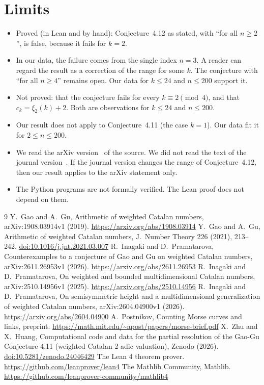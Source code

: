 \documentclass[11pt]{article}
\theoremstyle{remark}
\begin{document}
\section{Limits}

\begin{itemize}
\item Proved (in Lean and by hand): Conjecture~4.12 as stated, with ``for all $n\ge2$'', is false, because it fails for $k=2$.
\item In our data, the failure comes from the single index $n=3$. A reader can regard the result as a correction of the range for some $k$. The conjecture with ``for all $n\ge4$'' remains open. Our data for $k\le 24$ and $n\le 200$ support it.
\item Not proved: that the conjecture fails for every $k\equiv2\pmod 4$, and that $c_k=\xi_2(k)+2$. Both are observations for $k\le 24$ and $n\le 200$.
\item Our result does not apply to Conjecture~4.11 (the case $k=1$). Our data fit it for $2\le n\le 200$.
\item We read the arXiv version~\cite{GG} of the source. We did not read the text of the journal version~\cite{GGjnt}. If the journal version changes the range of Conjecture~4.12, then our result applies to the arXiv statement only.
\item The Python programs are not formally verified. The Lean proof does not depend on them.
\end{itemize}

\begin{thebibliography}{9}
 Y.~Gao and A.~Gu, Arithmetic of weighted Catalan numbers, arXiv:1908.03914v1 (2019). \url{https://arxiv.org/abs/1908.03914}
 Y.~Gao and A.~Gu, Arithmetic of weighted Catalan numbers, J.~Number Theory 226 (2021), 213--242. \href{https://doi.org/10.1016/j.jnt.2021.03.007}{doi:10.1016/j.jnt.2021.03.007}
 R.~Inagaki and D.~Pramatarova, Counterexamples to a conjecture of Gao and Gu on weighted Catalan numbers, arXiv:2611.26953v1 (2026). \url{https://arxiv.org/abs/2611.26953}
 R.~Inagaki and D.~Pramatarova, On weighted and bounded multidimensional Catalan numbers, arXiv:2510.14956v1 (2025). \url{https://arxiv.org/abs/2510.14956}
 R.~Inagaki and D.~Pramatarova, On semisymmetric height and a multidimensional generalization of weighted Catalan numbers, arXiv:2604.04900v1 (2026). \url{https://arxiv.org/abs/2604.04900}
 A.~Postnikov, Counting Morse curves and links, preprint. \url{https://math.mit.edu/~apost/papers/morse-brief.pdf}
 X.~Zhu and X.~Huang, Computational code and data for the partial resolution of the Gao-Gu Conjecture 4.11 (weighted Catalan 2-adic valuation), Zenodo (2026). \href{https://doi.org/10.5281/zenodo.24046429}{doi:10.5281/zenodo.24046429}
 The Lean 4 theorem prover. \url{https://github.com/leanprover/lean4}
 The Mathlib Community, Mathlib. \url{https://github.com/leanprover-community/mathlib4}
\end{thebibliography}
\end{document}
